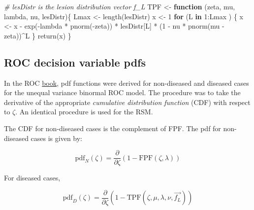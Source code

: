 \documentclass[
]{book}
\newenvironment{Shaded}{\begin{snugshade}}{\end{snugshade}}
\newcommand{\CommentTok}[1]{\textcolor[rgb]{0.56,0.35,0.01}{\textit{#1}}}
\newcommand{\ControlFlowTok}[1]{\textcolor[rgb]{0.13,0.29,0.53}{\textbf{#1}}}
\newcommand{\DecValTok}[1]{\textcolor[rgb]{0.00,0.00,0.81}{#1}}
\newcommand{\FunctionTok}[1]{\textcolor[rgb]{0.00,0.00,0.00}{#1}}
\newcommand{\NormalTok}[1]{#1}
\newcommand{\OtherTok}[1]{\textcolor[rgb]{0.56,0.35,0.01}{#1}}
\newcommand{\SpecialCharTok}[1]{\textcolor[rgb]{0.00,0.00,0.00}{#1}}
\begin{document}
\begin{Shaded}
\begin{Highlighting}[]
\CommentTok{\# lesDistr is the lesion distribution vector f\_L}
\NormalTok{TPF }\OtherTok{\textless{}{-}} \ControlFlowTok{function}\NormalTok{ (zeta, mu, lambda, nu, lesDistr)\{}
\NormalTok{  Lmax }\OtherTok{\textless{}{-}} \FunctionTok{length}\NormalTok{(lesDistr)}
\NormalTok{  x }\OtherTok{\textless{}{-}} \DecValTok{1}
  \ControlFlowTok{for}\NormalTok{ (L }\ControlFlowTok{in} \DecValTok{1}\SpecialCharTok{:}\NormalTok{Lmax ) \{}
\NormalTok{    x }\OtherTok{\textless{}{-}}\NormalTok{ x }\SpecialCharTok{{-}} \FunctionTok{exp}\NormalTok{(}\SpecialCharTok{{-}}\NormalTok{lambda }\SpecialCharTok{*} \FunctionTok{pnorm}\NormalTok{(}\SpecialCharTok{{-}}\NormalTok{zeta)) }\SpecialCharTok{*} 
\NormalTok{      lesDistr[L] }\SpecialCharTok{*}\NormalTok{ (}\DecValTok{1} \SpecialCharTok{{-}}\NormalTok{ nu }\SpecialCharTok{*} \FunctionTok{pnorm}\NormalTok{(mu }\SpecialCharTok{{-}}\NormalTok{ zeta))}\SpecialCharTok{\^{}}\NormalTok{L}
\NormalTok{  \}}
  \FunctionTok{return}\NormalTok{(x)}
\NormalTok{\}}
\end{Highlighting}
\end{Shaded}

\hypertarget{rsm-predictions-roc-curve-pdfs}{%
\subsection{ROC decision variable pdfs}\label{rsm-predictions-roc-curve-pdfs}}

In the ROC \href{https://dpc10ster.github.io/RJafrocRocBook/}{book}, pdf functions were derived for non-diseased and diseased cases for the unequal variance binormal ROC model. The procedure was to take the derivative of the appropriate \emph{cumulative distribution function} (CDF) with respect to \(\zeta\). An identical procedure is used for the RSM.

The CDF for non-diseased cases is the complement of FPF. The pdf for non-diseased cases is given by:

\begin{equation}
\text{pdf}_N\left ( \zeta \right ) = \frac{\partial }{\partial \zeta} \left ( 1-\text{FPF}\left (\zeta , \lambda\right ) \right ) 
\label{eq:rsm-predictions-pdf-n}
\end{equation}

For diseased cases,

\begin{equation}
\text{pdf}_D\left ( \zeta \right ) = \frac{\partial }{\partial \zeta} \left ( 1-\text{TPF}\left (\zeta , \mu, \lambda, \nu, \overrightarrow{f_L} \right ) \right ) 
\label{eq:rsm-predictions-pdf-d}
\end{equation}
\end{document}
